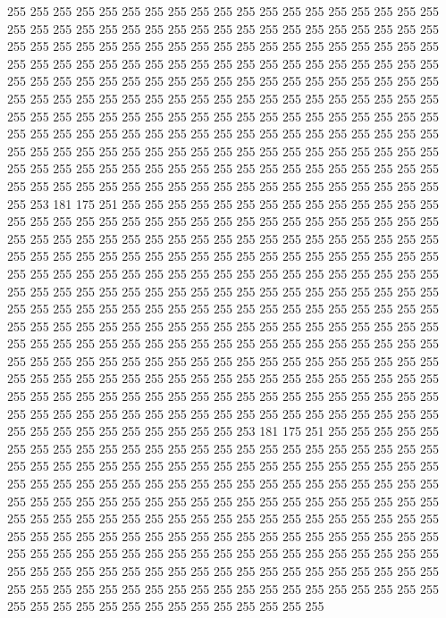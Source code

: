 255 255 255 255 255 255 255 255 255 255 255 255 255 255 255 255 255 255 255 255
255 255 255 255 255 255 255 255 255 255 255 255 255 255 255 255 255 255 255 255
255 255 255 255 255 255 255 255 255 255 255 255 255 255 255 255 255 255 255 255
255 255 255 255 255 255 255 255 255 255 255 255 255 255 255 255 255 255 255 255
255 255 255 255 255 255 255 255 255 255 255 255 255 255 255 255 255 255 255 255
255 255 255 255 255 255 255 255 255 255 255 255 255 255 255 255 255 255 255 255
255 255 255 255 255 255 255 255 255 255 255 255 255 255 255 255 255 255 255 255
255 255 255 255 255 255 255 255 255 255 255 255 255 255 255 255 255 255 255 255
255 255 255 255 255 255 255 255 255 255 255 255 255 255 255 255 255 255 255 255
255 255 255 255 255 255 255 255 255 255 255 255 255 255 255 255 255 255 255 255
255 255 255 255 255 255 255 255 255 255 253 181 175 251 255 255 255 255 255 255
255 255 255 255 255 255 255 255 255 255 255 255 255 255 255 255 255 255 255 255
255 255 255 255 255 255 255 255 255 255 255 255 255 255 255 255 255 255 255 255
255 255 255 255 255 255 255 255 255 255 255 255 255 255 255 255 255 255 255 255
255 255 255 255 255 255 255 255 255 255 255 255 255 255 255 255 255 255 255 255
255 255 255 255 255 255 255 255 255 255 255 255 255 255 255 255 255 255 255 255
255 255 255 255 255 255 255 255 255 255 255 255 255 255 255 255 255 255 255 255
255 255 255 255 255 255 255 255 255 255 255 255 255 255 255 255 255 255 255 255
255 255 255 255 255 255 255 255 255 255 255 255 255 255 255 255 255 255 255 255
255 255 255 255 255 255 255 255 255 255 255 255 255 255 255 255 255 255 255 255
255 255 255 255 255 255 255 255 255 255 255 255 255 255 255 255 255 255 255 255
255 255 255 255 255 255 255 255 255 255 255 255 255 255 255 255 255 255 255 255
255 255 255 255 255 255 255 255 255 255 255 255 255 255 255 255 255 255 255 255
255 255 255 255 255 255 253 181 175 251 255 255 255 255 255 255 255 255 255 255
255 255 255 255 255 255 255 255 255 255 255 255 255 255 255 255 255 255 255 255
255 255 255 255 255 255 255 255 255 255 255 255 255 255 255 255 255 255 255 255
255 255 255 255 255 255 255 255 255 255 255 255 255 255 255 255 255 255 255 255
255 255 255 255 255 255 255 255 255 255 255 255 255 255 255 255 255 255 255 255
255 255 255 255 255 255 255 255 255 255 255 255 255 255 255 255 255 255 255 255
255 255 255 255 255 255 255 255 255 255 255 255 255 255 255 255 255 255 255 255
255 255 255 255 255 255 255 255 255 255 255 255 255 255 255 255 255 255 255 255
255 255 255 255 255 255 255 255 255 255 255 255 255 255 255 255 255 255 255 255
255 255 255 255 255 255 255 255 255 255 255 255 255 255 255 255 255 255 255 255
